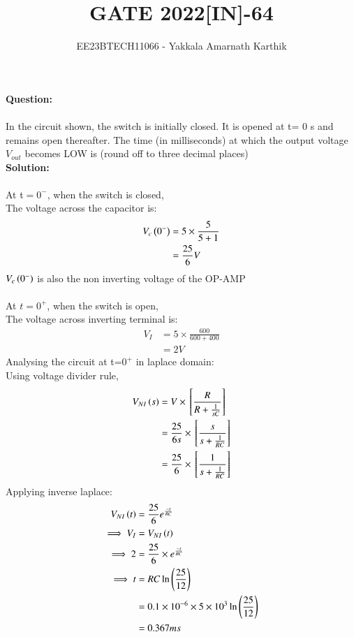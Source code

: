 \documentclass[journal,12pt,twocolumn]{IEEEtran}
\begin{document}


\title{GATE 2022[IN]-64}
\author{EE23BTECH11066 - Yakkala Amarnath Karthik}
\maketitle


\textbf{Question:}\\ \\
In the circuit shown, the switch is initially closed. It is opened at t= 0 s and
remains open thereafter. The time (in milliseconds) at which the output voltage
$V_{out}$ becomes LOW is  (round off to three decimal places)\\


\textbf{Solution:}\\ \\
At t$=0^-$, when the switch is closed,\\
The voltage across the capacitor is:
\begin{align}
V_c\left(0^-\right)&=5\times\frac{5}{5+1}\\
&=\frac{25}{6}V
\end{align}
$V_c\left(0^-\right)$ is also the non inverting voltage of the OP-AMP\\ \\
At $t=0^+$, when the switch is open,\\
The voltage across inverting terminal is:
\begin{align}
V_I&=5\times\frac{600}{600+400}\\
&=2V
\end{align}
Analysing the circuit at t=$0^+$ in laplace domain:\\ 

Using voltage divider rule,
\begin{align}
V_{NI}\left(s\right)&=V\times{}\left[\frac{R}{R+\frac{1}{sC}}\right]\\
    &=\frac{25}{6s}\times{}\left[\frac{s}{s+\frac{1}{RC}}\right]\\
    &=\frac{25}{6}\times{}\left[\frac{1}{s+\frac{1}{RC}}\right]
\end{align}
Applying inverse laplace:
\begin{align}
    V_{NI}\left(t\right)&=\frac{25}{6} e^{\frac{-t}{RC}}\\
   \implies V_{I}&=V_{NI}\left(t\right)\\
    \implies  2&=\frac{25}{6}\times e^{\frac{-t}{RC}}\\
  \implies  t&=RC\ln\left(\frac{25}{12}\right)\\
    &=0.1\times10^{-6}\times5\times10^{3}\ln{\ensuremath{\left(\frac{25}{12}\right)}}\\
    &=0.367ms
\end{align}
\end{document}
